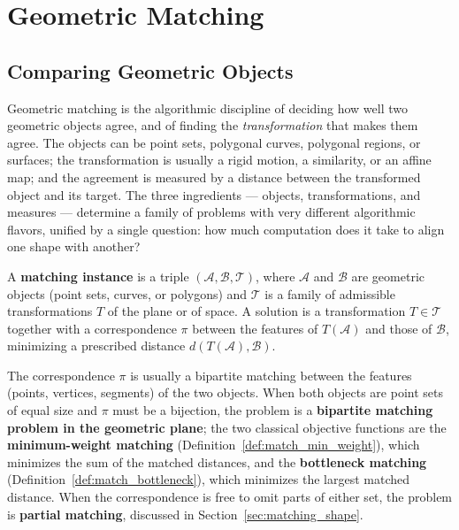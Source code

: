 \chapter{Geometric Matching}
\label{ch:geometric_matching}

\section{Comparing Geometric Objects}
\label{sec:matching_intro}

Geometric matching is the algorithmic discipline of
deciding how well two geometric objects agree, and of finding the
\emph{transformation} that makes them agree. The objects can be point sets,
polygonal curves, polygonal regions, or surfaces; the transformation is
usually a rigid motion, a similarity, or an affine map; and the agreement is
measured by a distance between the transformed object and its target. The
three ingredients --- objects, transformations, and measures --- determine a
family of problems with very different algorithmic flavors, unified by a
single question: how much computation does it take to align one shape with
another?

\begin{definition}\label{def:match_instance}
  A \textbf{matching instance} is a triple $(\mathcal{A}, \mathcal{B},
  \mathcal{T})$, where $\mathcal{A}$ and $\mathcal{B}$ are geometric objects
  (point sets, curves, or polygons) and $\mathcal{T}$ is a family of
  admissible transformations $T$ of the plane or of space. A solution is a
  transformation $T \in \mathcal{T}$ together with a correspondence
  $\pi$ between the features of $T(\mathcal{A})$ and those of
  $\mathcal{B}$, minimizing a prescribed distance $d(T(\mathcal{A}),
  \mathcal{B})$.
\end{definition}

The correspondence $\pi$ is usually a bipartite matching between the
features (points, vertices, segments) of the two objects. When both objects
are point sets of equal size and $\pi$ must be a bijection, the problem is a
\textbf{bipartite matching problem in the geometric plane}; the two classical
objective functions are the \textbf{minimum-weight matching}
(Definition~\ref{def:match_min_weight}), which minimizes the sum of the
matched distances, and the \textbf{bottleneck matching}
(Definition~\ref{def:match_bottleneck}), which minimizes the largest matched
distance. When the correspondence is free to omit parts of either set, the
problem is \textbf{partial matching}, discussed in
Section~\ref{sec:matching_shape}.

